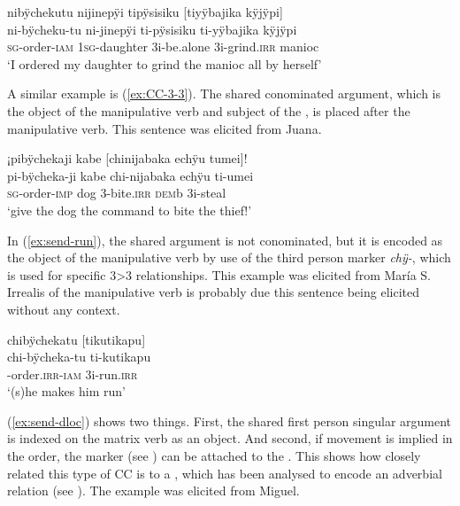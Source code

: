 \ea\label{ex:send-1}
\begingl
\glpreamble nibÿchekutu nijinepÿi tipÿsisiku \textup{[}tiyÿbajika kÿjÿpi\textup{]}\\
\gla ni-bÿcheku-tu ni-jinepÿi ti-pÿsisiku ti-yÿbajika kÿjÿpi\\
\textsc{sg}-order-\textsc{iam} 1\textsc{sg}-daughter 3i-be.alone 3i-grind.\textsc{irr} manioc\\
\glft ‘I ordered my daughter to grind the manioc all by herself’
\endgl
\trailingcitation{[cux-120410ls.223]}
\xe


A similar example is (\ref{ex:CC-3-3}). The shared conominated argument, which is the object of the manipulative verb and subject of the , is placed after the manipulative verb. This sentence was elicited from Juana.

\ea\label{ex:CC-3-3}
\begingl
\glpreamble ¡pibÿchekaji kabe \textup{[}chinijabaka echÿu tumei\textup{]}!\\
\gla pi-bÿcheka-ji kabe chi-nijabaka echÿu ti-umei\\
\textsc{sg}-order-\textsc{imp} dog 3-bite.\textsc{irr} \textsc{dem}b 3i-steal\\
\glft ‘give the dog the command to bite the thief!’
\endgl
\trailingcitation{[jxx-e191021e-2]}
\xe

In (\ref{ex:send-run}), the shared argument is not conominated, but it is encoded as the object of the manipulative verb by use of the third person marker \textit{chÿ-}, which is used for specific 3>3 relationships. This example was elicited from María S. Irrealis of the manipulative verb is probably due this sentence being elicited without any context.

\ea\label{ex:send-run}
\begingl
\glpreamble chibÿchekatu \textup{[}tikutikapu\textup{]}\\
\gla chi-bÿcheka-tu ti-kutikapu\\
-order.\textsc{irr}-\textsc{iam} 3i-run.\textsc{irr}\\
\glft ‘(s)he makes him run’
\endgl
\trailingcitation{[rxx-e141230s.123]}
\xe

(\ref{ex:send-dloc}) shows two things. First, the shared first person singular argument is indexed on the matrix verb as an object. And second, if movement is implied in the order, the  marker (see ) can be attached to the . This shows how closely related this type of CC is to a , which has been analysed to encode an adverbial relation (see ). The example was elicited from Miguel.


